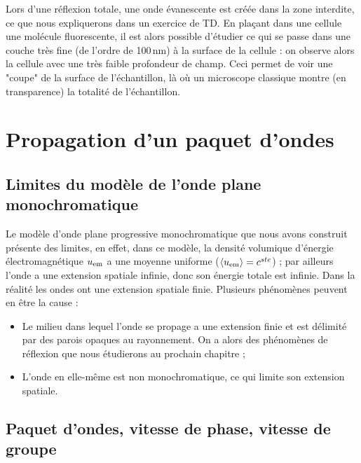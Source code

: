 \documentclass[11pt,fleqn]{book} %
\begin{document}
\begin{encart}
	Lors d'une réflexion totale, une onde évanescente est créée dans la zone interdite, ce que nous expliquerons dans un exercice de TD. En plaçant dans une cellule une molécule fluorescente, il est alors possible d'étudier ce qui se passe dans une couche très fine (de l'ordre de 100\,nm) à la surface de la cellule : on observe alors la cellule avec une très faible profondeur de champ. Ceci permet de voir une "coupe" de la surface de l'échantillon, là où un microscope classique montre (en transparence) la totalité de l'échantillon.
\end{encart}

\section{Propagation d'un paquet d'ondes}

\subsection{Limites du modèle de l'onde plane monochromatique}

Le modèle d'onde plane progressive monochromatique que nous avons construit présente des limites, en effet, dans ce modèle, la densité volumique d'énergie électromagnétique $u_{\rm em}$ a une moyenne uniforme ($\langle u_{\rm em} \rangle = c^{ste}$) ; par ailleurs l'onde a une extension spatiale infinie, donc son énergie totale est infinie. Dans la réalité les ondes ont une extension spatiale finie. Plusieurs phénomènes peuvent en être la cause :
\begin{itemize}
	\item Le milieu dans lequel l'onde se propage a une extension finie et est délimité par des parois opaques au rayonnement. On a alors des phénomènes de réflexion que nous étudierons au prochain chapitre ;
	\item L'onde en elle-même est non monochromatique, ce qui limite son extension spatiale.
\end{itemize}

\subsection{Paquet d'ondes, vitesse de phase, vitesse de groupe}
\end{document}
